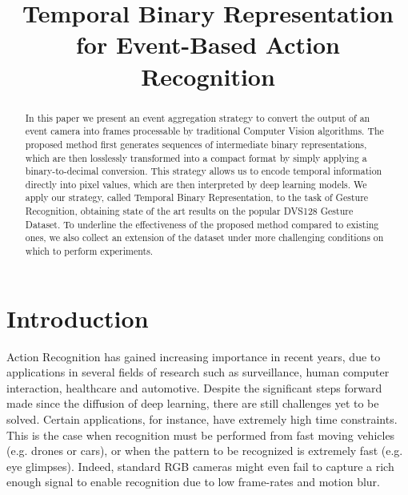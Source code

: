 \documentclass[a4paper,conference]{IEEEtran}
\begin{document}
\title{Temporal Binary Representation for Event-Based Action Recognition}


\author{
\and
{}
\and
{}
\and
{}
}













\maketitle

\begin{abstract}
In this paper we present an event aggregation strategy to convert the output of an event camera into frames processable by traditional Computer Vision algorithms. The proposed method first generates sequences of intermediate binary representations, which are then losslessly transformed into a compact format by simply applying a binary-to-decimal conversion. This strategy allows us to encode temporal information directly into pixel values, which are then interpreted by deep learning models. We apply our strategy, called Temporal Binary Representation, to the task of Gesture Recognition, obtaining state of the art results on the popular DVS128 Gesture Dataset. To underline the effectiveness of the proposed method compared to existing ones, we also collect an extension of the dataset under more challenging conditions on which to perform experiments.
\end{abstract}






\IEEEpeerreviewmaketitle



\section{Introduction}
Action Recognition has gained increasing importance in recent years, due to applications in several fields of research such as surveillance, human computer interaction, healthcare and automotive. Despite the significant steps forward made since the diffusion of deep learning, there are still challenges yet to be solved. Certain applications, for instance, have extremely high time constraints. This is the case when recognition must be performed from fast moving vehicles (e.g. drones or cars), or when the pattern to be recognized is extremely fast (e.g. eye glimpses).
Indeed, standard RGB cameras might even fail to capture a rich enough signal to enable recognition due to low frame-rates and motion blur.
\end{document}
